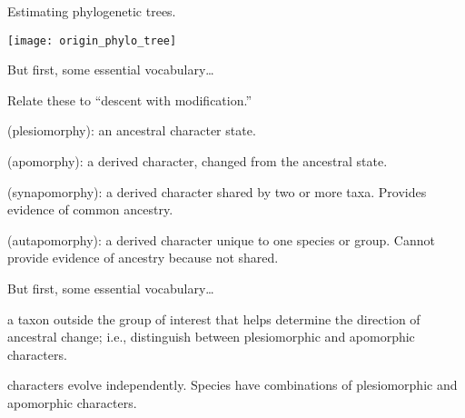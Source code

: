 \documentclass[t]{beamer}
\begin{document}

\begin{frame}[t]{Estimating phylogenetic trees.}
	
\texttt{[image: origin\_phylo\_tree]}	
\end{frame}

\begin{frame}[t]{But first, some essential vocabulary\dots}

Relate these to “descent with modification.”

\hangpara {} (plesiomorphy): an ancestral character state.

\hangpara {} (apomorphy): a derived character, changed from the ancestral state.

\hangpara {} (synapomorphy): a derived character shared by two or more taxa. Provides evidence of common ancestry.

\hangpara {} (autapomorphy): a derived character unique to one species or group. Cannot provide evidence of ancestry because not shared.

\end{frame}

\begin{frame}[t]{But first, some essential vocabulary\dots}

\hangpara {} a taxon outside the group of interest that helps determine the direction of ancestral change; i.e., distinguish between plesiomorphic and apomorphic characters.

\hangpara {} characters evolve independently. Species have combinations of plesiomorphic and apomorphic characters.

\end{frame}
\end{document}
